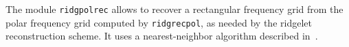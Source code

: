 The module {\tt ridgpolrec} allows to recover a rectangular frequency grid from
the polar frequency grid computed by {\tt ridgrecpol}, as needed by the ridgelet
reconstruction scheme. It uses a nearest-neighbor algorithm described in~\cite{starck.candes.ea:curvelet}.
